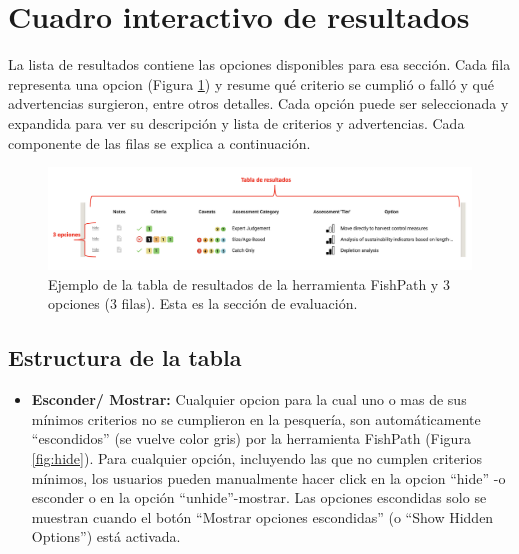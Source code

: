 \documentclass[
  11pt,
]{book}
\providecommand{\tightlist}{%
  \setlength{\itemsep}{0pt}\setlength{\parskip}{0pt}}
\begin{document}
\hypertarget{interactive-results-table}{%
\section{Cuadro interactivo de resultados}\label{interactive-results-table}}

La lista de resultados contiene las opciones disponibles para esa sección. Cada fila representa una opcion (Figura \ref{fig:result-rows}) y resume qué criterio se cumplió o falló y qué advertencias surgieron, entre otros detalles. Cada opción puede ser seleccionada y expandida para ver su descripción y lista de criterios y advertencias. Cada componente de las filas se explica a continuación.

\begin{figure}

{\centering \includegraphics[width=0.95\linewidth]{images/results-rows-es} 

}

\caption{Ejemplo de la tabla de resultados de la herramienta FishPath y 3 opciones (3 filas). Esta es la sección de evaluación.}\label{fig:result-rows}
\end{figure}

\hypertarget{estructura-de-la-tabla}{%
\subsection{Estructura de la tabla}\label{estructura-de-la-tabla}}

\begin{itemize}
\tightlist
\item
  \textbf{Esconder/ Mostrar:} Cualquier opcion para la cual uno o mas de sus mínimos criterios no se cumplieron en la pesquería, son automáticamente ``escondidos'' (se vuelve color gris) por la herramienta FishPath (Figura \ref{fig:hide}). Para cualquier opción, incluyendo las que no cumplen criterios mínimos, los usuarios pueden manualmente hacer click en la opcion ``hide'' -o esconder o en la opción ``unhide''-mostrar. Las opciones escondidas solo se muestran cuando el botón ``Mostrar opciones escondidas'' (o ``Show Hidden Options'') está activada.
\end{itemize}
\end{document}
